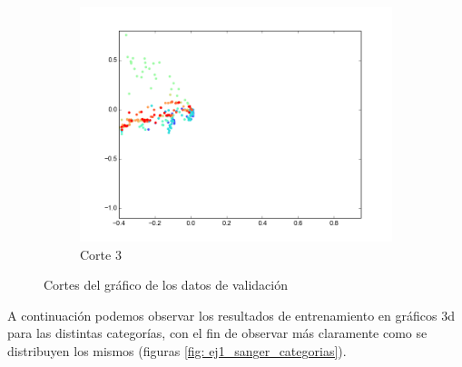 \begin{figure}[H]
\begin{subfigure}[b]{0.33\textwidth}
                \includegraphics[width=\linewidth]{secciones/graficos/sanger/eje3_valid.png}
                \caption{Corte 3}
                \label{fig: ej1_sanger_eje_3_valid}
        \end{subfigure}
        \caption{Cortes del gráfico de los datos de validación}
        \label{fig: ej1_sanger_ejes_valid}
\end{figure}


\par A continuación podemos observar los resultados de entrenamiento en gráficos 3d para las distintas categorías, con el fin de observar más claramente como se distribuyen los mismos (figuras \ref{fig: ej1_sanger_categorias}). 

